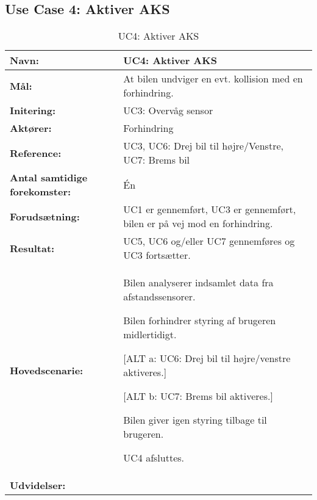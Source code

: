 \subsection{Use Case 4: Aktiver AKS}
\begin{table}[h]
\begin{tabularx}{\textwidth}{| L{3.3 cm} | Z |} \hline

\textbf{Navn:} 						& UC4: Aktiver AKS\\ \hline
\textbf{Mål:}						& At bilen undviger en evt. kollision med en forhindring. \\ \hline
\textbf{Initering:}					& UC3: Overvåg sensor \\ \hline
\textbf{Aktører:} 					& Forhindring \\ \hline
\textbf{Reference:} 				& UC3, UC6: Drej bil til højre/Venstre, UC7: Brems bil \\ \hline
\textbf{Antal samtidige forekomster:} & Én \\ \hline
\textbf{Forudsætning:} 				& UC1 er gennemført, UC3 er gennemført, bilen er på vej mod en forhindring. \\ \hline
\textbf{Resultat:}					& UC5, UC6 og/eller UC7 gennemføres og UC3 fortsætter. \\ \hline
\textbf{Hovedscenarie:}				& 

\begin{packed_enum}
\item Bilen analyserer indsamlet data fra afstandssensorer.
\item Bilen forhindrer styring af brugeren midlertidigt.
\item 
	\begin{packed_item}\itemsep1pt \parskip0pt 
	\item {[}ALT a: UC6: Drej bil til højre/venstre aktiveres.{]}
	\item {[}ALT b: UC7: Brems bil aktiveres.{]}
	\end{packed_item}
\item Bilen giver igen styring tilbage til brugeren.
\item UC4 afsluttes.
\end{packed_enum} \\ \hline
\textbf{Udvidelser:}				&  

\\ \hline
\end{tabularx}
\caption{UC4: Aktiver AKS}
\label{tbl:UC4}
\end{table}